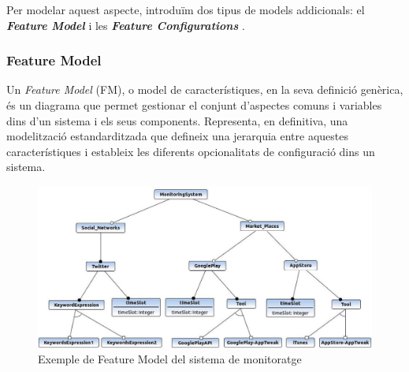 Per modelar aquest aspecte, introduïm dos tipus de models addicionals: el \textbf{\textit{Feature Model}} i les \textbf{\textit{Feature Configurations}} \cite{fm}.

\subsubsection{Feature Model}

Un \textit{Feature Model} (FM), o model de característiques, en la seva definició genèrica, és un diagrama que permet gestionar el conjunt d'aspectes comuns i variables dins d'un sistema i els seus components. Representa, en definitiva, una modelització estandarditzada que defineix una jerarquia entre aquestes característiques i estableix les diferents opcionalitats de configuració dins un sistema.\\

\begin{figure}
\centering
\includegraphics[width=14cm]{Figures/Figure17}
\decoRule
\caption{Exemple de Feature Model del sistema de monitoratge}
\label{fig:Figura17}
\end{figure}

